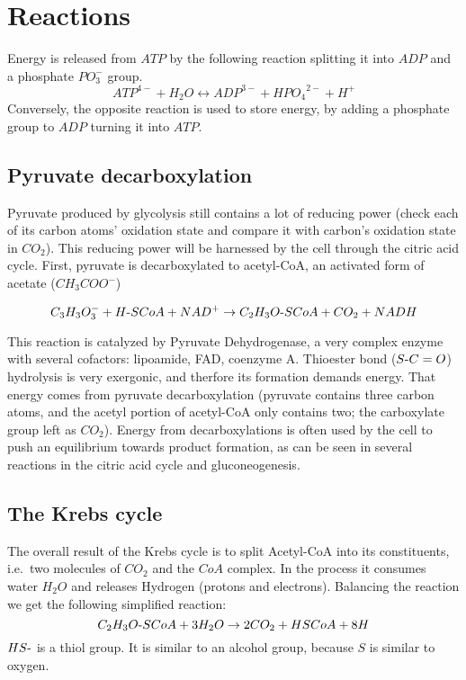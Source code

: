 \documentclass{article}
\def\mhyphen{{\hbox{-}}}
\begin{document}

\pagebreak
\section{Reactions}\label{sec_reactions}

Energy is released from $ATP$ by the following reaction splitting it into $ADP$ and a
phosphate $PO_3^-$ group.
\[
    {ATP}^{4-} + H_2O \leftrightarrow {ADP}^{3-} + {HPO_4}^{2-} + H^+
\]
Conversely, the opposite reaction is used to store energy, by adding a phosphate group to
$ADP$ turning it into $ATP$.

\subsection{Pyruvate decarboxylation}
Pyruvate produced by glycolysis still contains a lot of reducing power (check each of its
carbon atoms' oxidation state and compare it with carbon's oxidation state in $CO_2$). This
reducing power will be harnessed by the cell through the citric acid cycle. First,
pyruvate is decarboxylated to acetyl-CoA, an activated form of acetate ($CH_3COO^-$)

\[
    C_3H_3O_3^- + H{\mhyphen}SCoA + NAD^+ \rightarrow
    C_2H_3O{\mhyphen}SCoA + CO_2 + NADH
\]

This reaction is catalyzed by Pyruvate Dehydrogenase, a very complex enzyme with several
cofactors: lipoamide, FAD, coenzyme A. Thioester bond ($S{\mhyphen}C=O$) hydrolysis is very exergonic,
and therfore its formation demands energy. That energy comes from pyruvate decarboxylation
(pyruvate contains three carbon atoms, and the acetyl portion of acetyl-CoA only contains
two; the carboxylate group left as $CO_2$). Energy from decarboxylations is often used by the
cell to push an equilibrium towards product formation, as can be seen in several reactions
in the citric acid cycle and gluconeogenesis.

\subsection{The Krebs cycle}
The overall result of the Krebs cycle is to split Acetyl-CoA into its constituents, i.e.\
two molecules of $CO_2$ and the $CoA$ complex. In the process it consumes water $H_2O$ and
releases Hydrogen (protons and electrons). Balancing the reaction we get the following
simplified reaction:
\[
    C_2H_3O{\mhyphen}SCoA + 3H_2O \rightarrow 2CO_2 + HSCoA + 8H
\]
$HS{\mhyphen}$ is a thiol group. It is similar to an alcohol group, because $S$ is similar to
oxygen.
\end{document}
